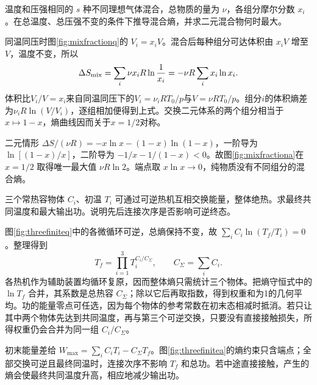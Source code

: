 \begin{exercise}[混合物组成与混合熵]
温度和压强相同的 $s$ 种不同理想气体混合，总物质的量为 $\nu$，各组分摩尔分数 $x_i$。在总温度、总压强不变的条件下推导混合熵，并求二元混合物何时最大。
\end{exercise}
\begin{solution}
同温同压时图\ref{fig:mixfractionq}的 $V_i=x_iV$。混合后每种组分可达体积由 $x_iV$ 增至 $V$，温度不变，所以
\[
 \Delta S_{\rm mix}=\sum_i\nu x_iR\ln\frac1{x_i}
 =-\nu R\sum_i x_i\ln x_i.
\]
体积比$V_i/V=x_i$来自同温同压下的$V_i=\nu_iRT_0/p$与$V=\nu RT_0/p$。组分$i$的体积熵差为$\nu_iR\ln(V/V_i)$，逐组相加便得到上式。交换二元体系的两个组分相当于$x\mapsto1-x$，熵曲线因而关于$x=1/2$对称。

二元情形 $\Delta S/(\nu R)=-x\ln x-(1-x)\ln(1-x)$，一阶导为 $\ln[(1-x)/x]$，二阶导为 $-1/x-1/(1-x)<0$。故图\ref{fig:mixfractiona}在 $x=1/2$ 取得唯一最大值 $\nu R\ln2$。端点取 $x\ln x\to0$，纯物质没有不同组分的混合熵。
\end{solution}

\begin{exercise}[三物体的最大做功]
三个常热容物体 $C_i$、初温 $T_i$ 可通过可逆热机互相交换能量，整体绝热。求最终共同温度和最大输出功。说明先后连接次序是否影响可逆终态。
\end{exercise}
\begin{solution}
图\ref{fig:threefiniteq}中的各微循环可逆，总熵保持不变，故 $\sum_iC_i\ln(T_f/T_i)=0$。整理得到
\[
 T_f=\prod_{i=1}^3T_i^{C_i/C_\Sigma},\qquad C_\Sigma=\sum_iC_i.
\]
各热机作为辅助装置均循环复原，因而整体熵只需统计三个物体。把熵守恒式中的 $\ln T_f$ 合并，其系数是总热容 $C_\Sigma$；除以它后再取指数，得到权重和为1的几何平均。功的能量零点可任选，因为每个物体的参考常数在初末态相减时抵消。若只让其中两个物体先达到共同温度，再与第三个可逆交换，只要没有直接接触损失，所得权重仍会合并为同一组 $C_i/C_\Sigma$。

初末能量差给 $W_{\max}=\sum_iC_iT_i-C_\Sigma T_f$。图\ref{fig:threefinitea}的熵约束只含端点；全部交换可逆且最终同温时，连接次序不影响 $T_f$ 和总功。若中途直接接触，产生的熵会使最终共同温度升高，相应地减少输出功。
\end{solution}

